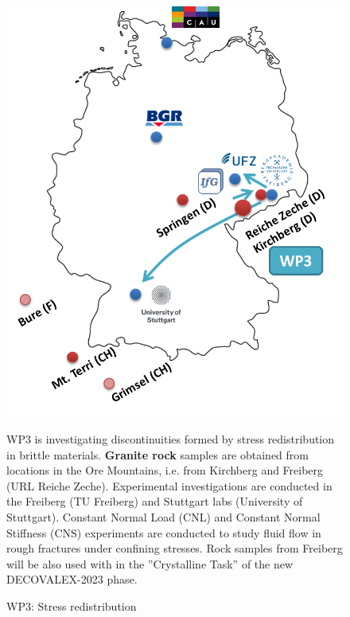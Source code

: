 \begin{figure}[h!]
\begin{minipage}{0.48\textwidth}
\includegraphics[width=\textwidth]{figures/geomint-wp3.png}
\caption{WP3: Stress redistribution}
\end{minipage}
\hfill
\begin{minipage}{0.48\textwidth}
WP3 is investigating discontinuities formed by stress redistribution in brittle materials. \textbf{Granite rock} samples are obtained from locations in the Ore Mountains, i.e. from Kirchberg and Freiberg (URL Reiche Zeche). Experimental  investigations are conducted in the Freiberg (TU Freiberg) and Stuttgart labs (University of Stuttgart). Constant Normal Load (CNL) and Constant Normal Stiffness (CNS) experiments are conducted to study fluid flow in rough fractures under confining stresses. Rock samples from Freiberg will be also used with in the ''Crystalline Task'' of the new DECOVALEX-2023 phase.
\end{minipage}
\end{figure}

